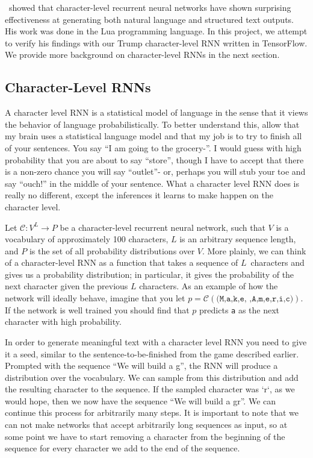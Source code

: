 \documentclass{article}
\begin{document}
\cite{karapathy2015}~showed that character-level recurrent neural networks have shown surprising effectiveness at generating both natural language and structured text outputs. His work was done in the Lua programming language.  In this project, we attempt to verify his findings with our Trump character-level RNN written in TensorFlow.  We provide more background on character-level RNNs in the next section.


\subsection{Character-Level RNNs}

A character level RNN is a statistical model of language in the sense that it views the behavior of language probabilistically. To better understand this, allow that my brain uses a statistical language model and that my job is to try to finish all of your sentences. You say ``I am going to the grocery-''. I would guess with high probability that you are about to say ``store'', though I have to accept that there is a non-zero chance you will say ``outlet''- or, perhaps you will stub your toe and say ``ouch!'' in the middle of your sentence. What a character level RNN does is really no different, except the inferences it learns to make happen on the character level.

Let $\mathcal{C} : V^L \rightarrow P$ be a character-level recurrent neural network, such that $V$ is a vocabulary of approximately 100 characters, $L$ is an arbitrary sequence length, and $P$ is the set of all probability distributions over $V$. More plainly, we can think of a character-level RNN as a function that takes a sequence of $L$~characters and gives us a probability distribution; in particular, it gives the probability of the next character given the previous $L$ characters. As an example of how the network will ideally behave, imagine that you let $p = \mathcal{C}(\texttt{(M,a,k,e, ,A,m,e,r,i,c)})$. If the network is well trained you should find that $p$ predicts \texttt{a} as the next character with high probability.

In order to generate meaningful text with a character level RNN you need to give it a seed, similar to the sentence-to-be-finished from the game described earlier. Prompted with the sequence ``We will build a g'', the RNN will produce a distribution over the vocabulary. We can sample from this distribution and add the resulting character to the sequence. If the sampled character was `r`, as we would hope, then we now have the sequence ``We will build a gr''. We can continue this process for arbitrarily many steps. It is important to note that we can not make networks that accept arbitrarily long sequences as input, so at some point we have to start removing a character from the beginning of the sequence for every character we add to the end of the sequence.
\end{document}
